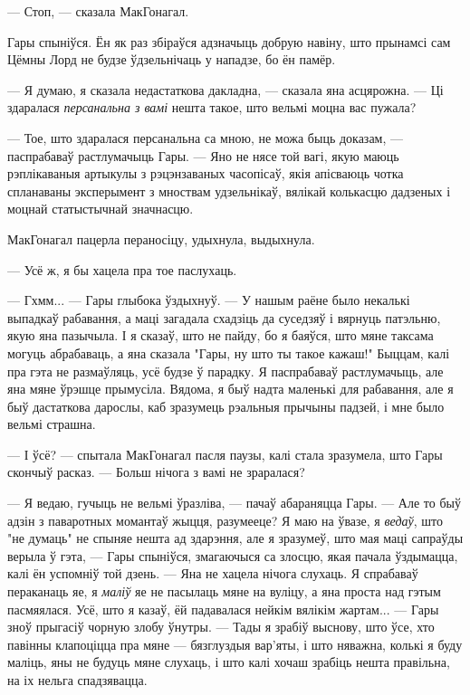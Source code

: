 --- Стоп, --- сказала МакГонагал.

Гары спыніўся. Ён як раз збіраўся адзначыць добрую навіну, што прынамсі сам 
Цёмны Лорд не будзе ўдзельнічаць у нападзе, бо ён памёр.

--- Я думаю, я сказала недастаткова дакладна, --- сказала яна асцярожна. --- Ці
здаралася \emph{персанальна з вамі} нешта такое, што вельмі моцна вас пужала?  

--- Тое, што здаралася персанальна са мною, не можа быць доказам, --- паспрабаваў
растлумачыць Гары. --- Яно не нясе той вагі, якую маюць рэплікаваныя 
артыкулы з рэцэнзаваных часопісаў, якія апісваюць чотка спланаваны эксперымент
з мноствам удзельнікаў, вялікай колькасцю дадзеных і моцнай статыстычнай
значнасцю. 

МакГонагал пацерла пераносіцу, удыхнула, выдыхнула.

--- Усё ж, я бы хацела пра тое паслухаць.

--- Гхмм... --- Гары глыбока ўздыхнуў. --- У нашым раёне было некалькі выпадкаў
рабавання, а маці загадала схадзіць да суседзяў і вярнуць патэльню, якую яна
пазычыла. І я сказаў, што не пайду, бо я баяўся, што мяне таксама могуць
абрабаваць, а яна сказала "Гары, ну што ты такое кажаш!" Быццам, калі пра гэта
не размаўляць, усё будзе ў парадку. Я паспрабаваў растлумачыць, але яна мяне
ўрэшце прымусіла. Вядома, я быў надта маленькі для рабавання, але я быў дастаткова
дарослы, каб зразумець рэальныя прычыны падзей, і мне было вельмі страшна.

--- І ўсё? --- спытала МакГонагал пасля паузы, калі стала зразумела, што Гары скончыў
расказ. --- Больш нічога з вамі не зраралася?

--- Я ведаю, гучыць не вельмі ўразліва, --- пачаў абараняцца Гары. --- Але то 
быў адзін з паваротных момантаў жыцця, разумееце? Я маю на ўвазе, я \emph{ведаў}, 
што "не думаць" не спыняе нешта ад здарэння, але я зразумеў, што мая маці сапраўды
верыла ў гэта, --- Гары спыніўся, змагаючыся са злосцю, якая пачала ўздымацца,
калі ён успомніў той дзень. --- Яна не хацела нічога слухаць. Я спрабаваў 
пераканаць яе, я \emph{маліў} яе не пасылаць мяне на вуліцу, а яна проста над гэтым
пасмяялася. Усё, што я казаў, ёй падавалася нейкім вялікім жартам... ---
Гары зноў прыгасіў чорную злобу ўнутры. --- Тады я зрабіў выснову, што ўсе, 
хто павінны клапоціцца пра мяне --- бязглуздыя вар'яты, і што няважна, колькі я буду 
маліць, яны не будуць мяне слухаць, і што калі хочаш зрабіць нешта правільна,
на іх нельга спадзявацца.

